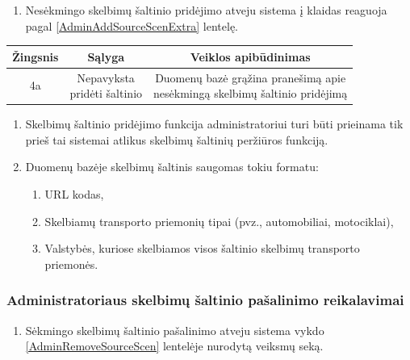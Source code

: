 \documentclass[12pt]{article}
\renewcommand{\thesubsection}{FR\arabic{subsection}}
\renewcommand*{\theenumi}{\thesubsection.\arabic{enumi}}
\begin{document}
	\begin{enumerate}[resume,labelindent=10pt,leftmargin=2.2cm]
		\item Nesėkmingo skelbimų šaltinio pridėjimo atveju sistema į klaidas reaguoja pagal \ref{AdminAddSourceScenExtra} lentelę.
	\end{enumerate}

		\begin{center}
		\begin{tabular}{ | c | c | c | }
			\hline
			Žingsnis & Sąlyga         & Veiklos apibūdinimas \\ \hline
			4a       & \makecell{Nepavyksta \\ pridėti šaltinio} & \makecell{Duomenų bazė grąžina pranešimą apie \\ nesėkmingą skelbimų šaltinio pridėjimą} \\ \hline
		\end{tabular}
		\end{center}
		\bigskip
		
	\begin{enumerate}[resume,labelindent=10pt,leftmargin=2.2cm]
		\item Skelbimų šaltinio pridėjimo funkcija administratoriui turi būti prieinama tik prieš tai sistemai atlikus skelbimų šaltinių peržiūros funkciją.
		\item Duomenų bazėje skelbimų šaltinis saugomas tokiu formatu:
		
			\begin{enumerate}[label=\theenumi.\arabic{enumii}]
				\item URL kodas,
				\item Skelbiamų transporto priemonių tipai (pvz., automobiliai, motociklai),
				\item Valstybės, kuriose skelbiamos visos šaltinio skelbimų transporto priemonės.
			\end{enumerate}
		 
	\end{enumerate}
	\pagebreak
	
	\subsubsection{Administratoriaus skelbimų šaltinio pašalinimo reikalavimai}
	\begin{enumerate}[labelindent=10pt,leftmargin=2.2cm]
		\item Sėkmingo skelbimų šaltinio pašalinimo atveju sistema vykdo \ref{AdminRemoveSourceScen} lentelėje nurodytą veiksmų seką.
	\end{enumerate}
		
\end{document}
